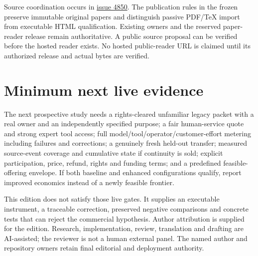 \documentclass[10 pt]{article}
\begin{document}
Source coordination occurs in \href{https://github.com/MontrealAI/AGI-Alpha-Agent-v0/issues/4850}{issue 4850}. The publication rules in the frozen  preserve immutable original papers and distinguish passive PDF/TeX import from executable HTML qualification. Existing owners and the reserved paper-reader release remain authoritative. A public source proposal can be verified before the hosted reader exists. No hosted public-reader URL is claimed until its authorized release and actual bytes are verified.

\section{Minimum next live evidence}

The next prospective study needs a rights-cleared unfamiliar legacy packet with a real owner and an independently specified purpose; a fair human-service quote and strong expert tool access; full model/tool/operator/customer-effort metering including failures and corrections; a genuinely fresh held-out transfer; measured source-event coverage and cumulative state if continuity is sold; explicit participation, price, refund, rights and funding terms; and a predefined feasible-offering envelope. If both baseline and enhanced configurations qualify, report improved economics instead of a newly feasible frontier.

This edition does not satisfy those live gates. It supplies an executable instrument, a traceable correction, preserved negative comparisons and concrete tests that can reject the commercial hypothesis. Author attribution is supplied for the edition. Research, implementation, review, translation and drafting are AI-assisted; the reviewer is not a human external panel. The named author and repository owners retain final editorial and deployment authority.
\end{document}
